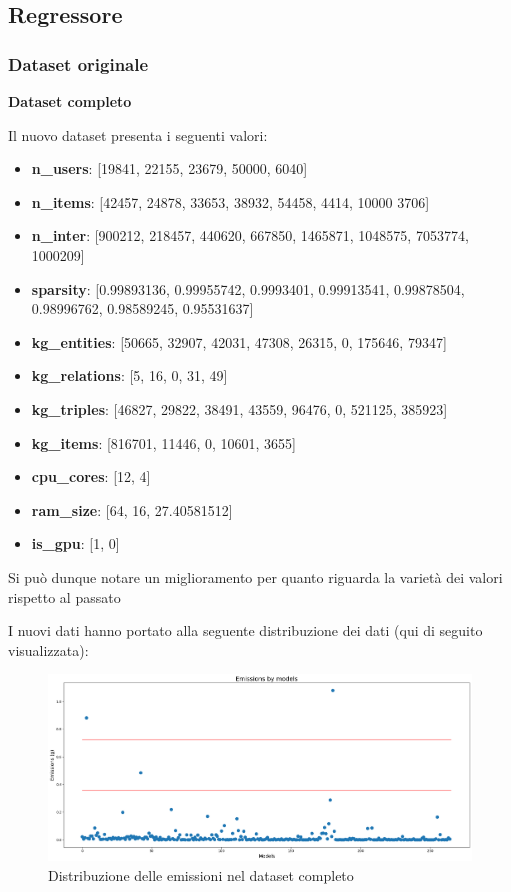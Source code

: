 \subsection{Regressore}

\subsubsection{Dataset originale}


\noindent \textbf{Dataset completo}


\noindent Il nuovo dataset presenta i seguenti valori:
\begin{itemize}
    \item \textbf{n\_users}: [19841, 22155, 23679, 50000, 6040]
    \item \textbf{n\_items}: [42457, 24878, 33653, 38932, 54458, 4414, 10000 3706]
    \item \textbf{n\_inter}: [900212, 218457, 440620, 667850, 1465871, 1048575, 7053774, 1000209]
    \item \textbf{sparsity}: [0.99893136, 0.99955742, 0.9993401, 0.99913541, 0.99878504, 0.98996762,
    0.98589245, 0.95531637]
    \item \textbf{kg\_entities}: [50665, 32907, 42031, 47308, 26315, 0, 175646, 79347]
    \item \textbf{kg\_relations}: [5, 16, 0, 31, 49]
    \item \textbf{kg\_triples}: [46827, 29822, 38491, 43559, 96476, 0, 521125, 385923]
    \item \textbf{kg\_items}: [816701, 11446, 0, 10601, 3655]
    \item \textbf{cpu\_cores}: [12, 4]
    \item \textbf{ram\_size}: [64, 16, 27.40581512]
    \item \textbf{is\_gpu}: [1, 0]
\end{itemize}

\noindent Si può dunque notare un miglioramento per quanto riguarda la varietà dei valori rispetto al passato

\noindent I nuovi dati hanno portato alla seguente distribuzione dei dati (qui di seguito visualizzata):
\begin{figure}[H]
    \centering
    \includegraphics[width=\textwidth]{images/nuova-situazione.png}
    \caption{Distribuzione delle emissioni nel dataset completo}
\end{figure}

